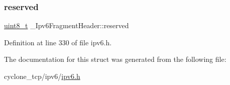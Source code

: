 \subsubsection{\texorpdfstring{reserved}{reserved}}
{\footnotesize\ttfamily \hyperlink{stdint_8h_aba7bc1797add20fe3efdf37ced1182c5}{uint8\+\_\+t} \+\_\+\+Ipv6\+Fragment\+Header\+::reserved}



Definition at line 330 of file ipv6.\+h.



The documentation for this struct was generated from the following file\+:\begin{DoxyCompactItemize}
\item 
cyclone\+\_\+tcp/ipv6/\hyperlink{ipv6_8h}{ipv6.\+h}\end{DoxyCompactItemize}
